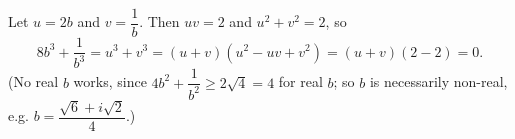 Let $u=2b$ and $v=\dfrac1b$. Then $uv=2$ and $u^2+v^2=2$, so
\[8b^3+\dfrac1{b^3}=u^3+v^3=(u+v)\left(u^2-uv+v^2\right)=(u+v)(2-2)=\boxed{0}.\]
(No real $b$ works, since $4b^2+\dfrac1{b^2}\ge2\sqrt4=4$ for real $b$; so $b$ is necessarily non-real, e.g. $b=\dfrac{\sqrt6+i\sqrt2}{4}$.)
